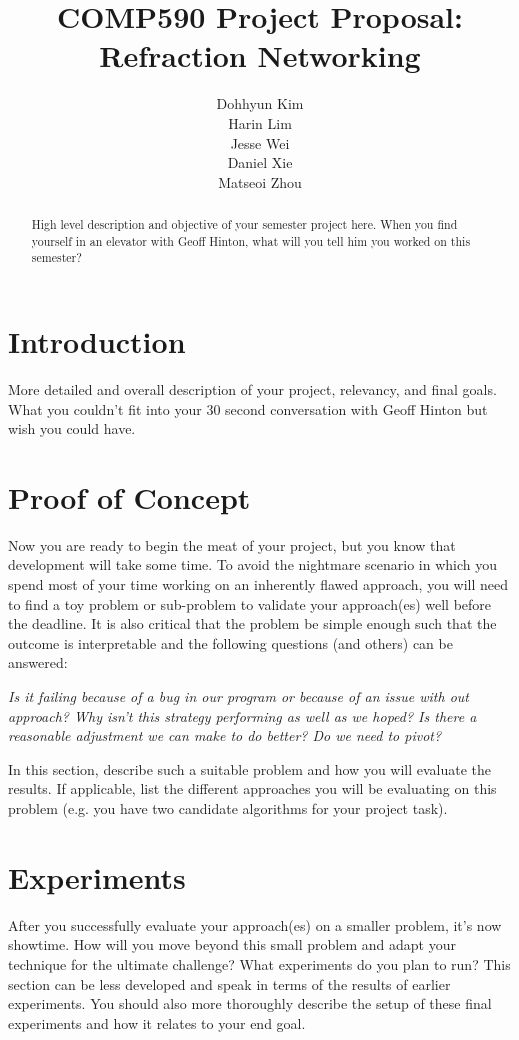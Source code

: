 \documentclass{article} %
\title{COMP590 Project Proposal: Refraction Networking}
\author{
Dohhyun Kim \\
\AND
Harin Lim \\
\AND
Jesse Wei \\
\AND
Daniel Xie \\
\AND
Matseoi Zhou \\
}
\begin{document}
\maketitle

\begin{abstract}
High level description and objective of your semester project here. When you find yourself in an elevator with Geoff Hinton, what will you tell him you worked on this semester?
\end{abstract}

\section{Introduction}
More detailed and overall description of your project, relevancy, and final goals. What you couldn't fit into your 30 second conversation with Geoff Hinton but wish you could have.

\section{Proof of Concept}
Now you are ready to begin the meat of your project, but you know that development will take some time. To avoid the nightmare scenario in which you spend most of your time working on an inherently flawed approach, you will need to find a toy problem or sub-problem to validate your approach(es) well before the deadline. It is also critical that the problem be simple enough such that the outcome is interpretable and the following questions (and others) can be answered:

\textit{Is it failing because of a bug in our program or because of an issue with out approach? Why isn't this strategy performing as well as we hoped? Is there a reasonable adjustment we can make to do better? Do we need to pivot?}

In this section, describe such a suitable problem and how you will evaluate the results. If applicable, list the different approaches you will be evaluating on this problem (e.g. you have two candidate algorithms for your project task).

\section{Experiments}

After you successfully evaluate your approach(es) on a smaller problem, it's now showtime. How will you move beyond this small problem and adapt your technique for the ultimate challenge? What experiments do you plan to run? This section can be less developed and speak in terms of the results of earlier experiments. You should also more thoroughly describe the setup of these final experiments and how it relates to your end goal.
\end{document}
